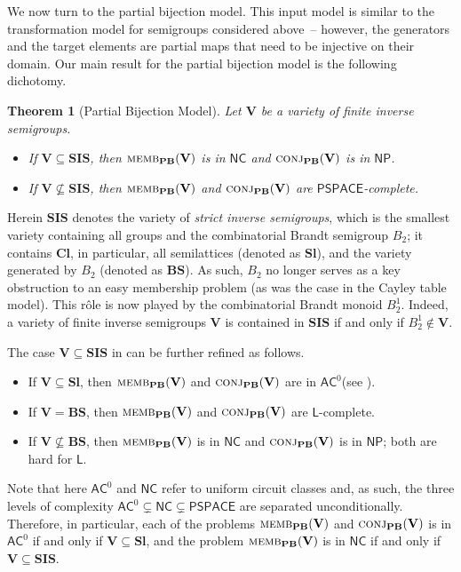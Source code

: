 \documentclass[anonymous,letter,UKenglish,cleveref,autoref,thm-restate]{lipics-v2021}
\newcommand{\sse}{\subseteq}
\newcommand{\ACz}{\ensuremath{\mathsf{AC}^0}\xspace}
\newcommand{\NC}{\ensuremath{\mathsf{NC}}\xspace}
\newcommand{\LOGSPACE}{\ensuremath{\mathsf{L}}\xspace}
\newcommand{\NP}{\ensuremath{\mathsf{NP}}\xspace}
\newcommand{\PSPACE}{\ensuremath{\mathsf{PSPACE}}\xspace}
\newcommand{\vV}{\ensuremath{\mathbf{V}}}
\newcommand{\vSl}{\ensuremath{\mathbf{Sl}}}
\newcommand{\vCl}{\ensuremath{\mathbf{Cl}}}
\newcommand{\vSI}{\ensuremath{\mathbf{SIS}}}
\newcommand{\vBS}{\ensuremath{\mathbf{BS}}}  \newcommand{\vBM}{\ensuremath{\mathbf{BM}}}
\theoremstyle{plain}
\theoremstyle{plain}
\newtheorem{maintheorem}{Theorem}
\newcommand{\dMemb}[2][]{\textup{\textsc{memb${}_{\mathbf{#1}}\expandafter\ifx\expandafter\relax\detokenize{#2}\relax\else(#2)\fi$}}}
\newcommand{\dConj}[2][]{\textup{\textsc{conj${}_{\mathbf{#1}}\expandafter\ifx\expandafter\relax\detokenize{#2}\relax\else(#2)\fi$}}}
\begin{document}
\medbreak

We now turn to the partial bijection model.
This input model is similar to the transformation model for semigroups considered above~-- however, the generators and the target elements are partial maps that need to be injective on their domain. 
Our main result for the partial bijection model is the following dichotomy.


\begin{maintheorem}[Partial Bijection Model]\label{thm:main-PB}
	Let $\vV$ be a variety of finite inverse semigroups. 
	\begin{itemize}
		\item If $\vV \sse \vSI$, then $\dMemb[PB]{\vV} $ is in \NC and $\dConj[PB]{\vV}$ is in \NP.
		\item If $\vV \not\sse \vSI$, then $\dMemb[PB]{\vV}$ and $\dConj[PB]{\vV}$ are \PSPACE-complete.
	\end{itemize}
\end{maintheorem}

Herein $\vSI$ denotes the variety of \emph{strict inverse semigroups}, which is the smallest variety containing all groups and the combinatorial Brandt semigroup $B_2$; it contains $\vCl$, in particular, all semilattices (denoted as $\vSl$), and the variety generated by $B_2$ (denoted as $\vBS$).
As such, $B_2$ no longer serves as a key obstruction to an easy membership problem (as was the case in the Cayley table model).
This r\^{o}le is now played by the combinatorial Brandt monoid $B_2^1$.
Indeed, a variety of finite inverse semigroups $\vV$ is contained in $\vSI$ if and only if $B_2^1 \not\in \vV$.

The case $\vV \sse \vSI$ in  can be further refined as follows.
\begin{itemize}
	\item If $\vV \sse \vSl$, then $\dMemb[PB]{\vV} $ and $\dConj[PB]{\vV}$ are in \ACz (see \cite{BeaudryMT92}).
	\item If $\vV = \vBS$, then $\dMemb[PB]{\vV} $ and $\dConj[PB]{\vV}$ are \LOGSPACE-complete.
	\item If $\vV \not\sse \vBS$, then $\dMemb[PB]{\vV} $ is in \NC and $\dConj[PB]{\vV}$ is in \NP; both are hard for \LOGSPACE.
\end{itemize}

Note that here \ACz and $\NC$ refer to uniform circuit classes and, as such, the three levels of complexity $\ACz \subsetneq \NC \subsetneq \PSPACE$ are separated unconditionally.
Therefore, in particular, each of the problems $\dMemb[PB]{\vV}$ and $\dConj[PB]{\vV}$ is in $\ACz$ if and only if $\vV \sse \vSl$, and the problem $\dMemb[PB]{\vV}$ is in $\NC$ if and only if $\vV \sse \vSI$.
\end{document}
